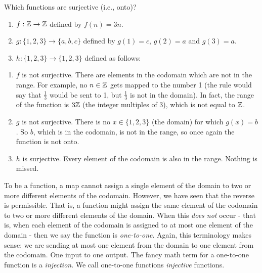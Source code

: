 \documentclass[12pt]{article}
\begin{document}
\begin{example}
  Which functions are surjective (i.e., onto)?
    \begin{enumerate}
    \item $f:\mathbb Z \to \mathbb Z$ defined by $f(n) = 3n$.  
    \item $g: \{1,2,3\} \to \{a,b,c\}$ defined by $g(1) = c$, $g(2) = a$ and $g(3) = a$.  
    \item $h:\{1,2,3\} \to \{1,2,3\}$ defined as follows:
    \begin{center}
    \end{center}
  \end{enumerate}
  \begin{solution}
    \begin{enumerate}
      \item $f$ is not surjective.  There are elements in the codomain which are not in the range.  For example, no $n \in \mathbb Z$ gets mapped to the number 1 (the rule would say that $\frac{1}{3}$ would be sent to 1, but $\frac{1}{3}$ is not in the domain).  In fact, the range of the function is $3\mathbb Z$ (the integer multiples of 3), which is not equal to $\mathbb Z$.
      \item $g$ is not surjective.  There is no $x \in \{1,2,3\}$ (the domain) for which $g(x) = b$.  So $b$, which is in the codomain, is not in the range, so once again the function is not onto.
      \item $h$ is surjective.  Every element of the codomain is also in the range.  Nothing is missed.
    \end{enumerate}

  \end{solution}

\end{example}


To be a function, a map cannot assign a single element of the domain to two or more different elements of the codomain.  However, we have seen that the reverse is permissible.  That is, a function might assign the same element of the codomain to two or more different elements of the domain.  When this {\em does not} occur - that is, when each element of the codomain is assigned to at most one element of the domain - then we say the function is {\em one-to-one}.  Again, this terminology makes sense: we are sending at most one element from the domain to one element from the codomain.  One input to one output. The fancy math term for a one-to-one function is a {\em injection}.  We call one-to-one functions {\em injective} functions.
\end{document}
